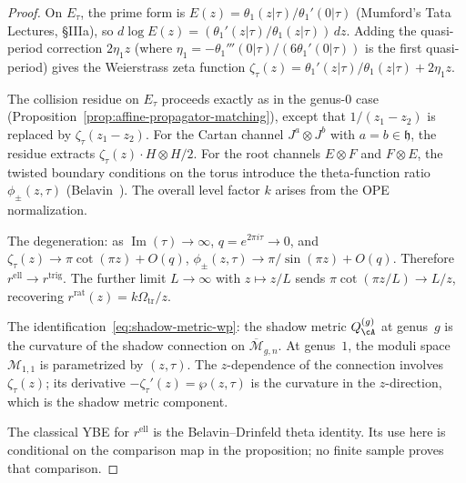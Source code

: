 \begin{proof}
On $E_\tau$, the prime form is
$E(z) = \theta_1(z|\tau)/\theta_1'(0|\tau)$
(Mumford's Tata Lectures, \S IIIa), so
$d\log E(z) = (\theta_1'(z|\tau)/\theta_1(z|\tau))\, dz$.
Adding the quasi-period correction $2\eta_1 z$ (where
$\eta_1 = -\theta_1'''(0|\tau)/(6\theta_1'(0|\tau))$ is the
first quasi-period) gives the Weierstrass zeta function
$\zeta_\tau(z) = \theta_1'(z|\tau)/\theta_1(z|\tau) + 2\eta_1 z$.

The collision residue on $E_\tau$ proceeds exactly as in the
genus-$0$ case (Proposition~\ref{prop:affine-propagator-matching}),
except that $1/(z_1 - z_2)$ is replaced by $\zeta_\tau(z_1 - z_2)$.
For the Cartan channel $J^a \otimes J^b$ with $a = b \in \mathfrak{h}$,
the residue extracts $\zeta_\tau(z) \cdot H \otimes H/2$. For the
root channels $E \otimes F$ and $F \otimes E$, the twisted boundary
conditions on the torus introduce the theta-function ratio
$\phi_\pm(z, \tau)$ (Belavin~\cite{Belavin81}). The overall
level factor $k$ arises from the OPE normalization.

The degeneration: as $\operatorname{Im}(\tau) \to \infty$,
$q = e^{2\pi i \tau} \to 0$, and
$\zeta_\tau(z) \to \pi \cot(\pi z) + O(q)$,
$\phi_\pm(z, \tau) \to \pi/\sin(\pi z) + O(q)$.
Therefore $r^{\mathrm{ell}} \to r^{\mathrm{trig}}$.
The further limit $L \to \infty$ with $z \mapsto z/L$ sends
$\pi \cot(\pi z/L) \to L/z$, recovering
$r^{\mathrm{rat}}(z)=k\Omega_{\mathrm{tr}}/z$.

The identification~\eqref{eq:shadow-metric-wp}: the shadow metric
$Q^{(g)}_\cA$ at genus~$g$ is the curvature of the shadow connection
on $\overline{\mathcal{M}}_{g,n}$. At genus~$1$, the moduli space
$\mathcal{M}_{1,1}$ is parametrized by $(z, \tau)$. The $z$-dependence of
the connection involves $\zeta_\tau(z)$; its derivative
$-\zeta_\tau'(z) = \wp(z, \tau)$ is the curvature in the
$z$-direction, which is the shadow metric component.

The classical YBE for $r^{\mathrm{ell}}$ is the Belavin--Drinfeld
theta identity.  Its use here is conditional on the comparison map in
the proposition; no finite sample proves that comparison.
\end{proof}

